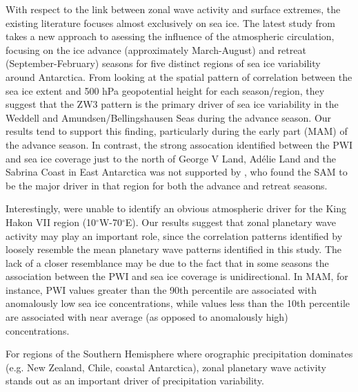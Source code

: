 With respect to the link between zonal wave activity and surface extremes, the existing literature focuses almost exclusively on sea ice. The latest study from \citet{Raphael2014} takes a new approach to asessing the influence of the atmospheric circulation, focusing on the ice advance (approximately March-August) and retreat (September-February) seasons for five distinct regions of sea ice variability around Antarctica. From looking at the spatial pattern of correlation between the sea ice extent and 500 hPa geopotential height for each season/region, they suggest that the ZW3 pattern is the primary driver of sea ice variability in the Weddell and Amundsen/Bellingshausen Seas during the advance season. Our results tend to support this finding, particularly during the early part (MAM) of the advance season. In contrast, the strong assocation identified between the PWI and sea ice coverage just to the north of George V Land, Ad{\'e}lie Land and the Sabrina Coast in East Antarctica was not supported by \citet{Raphael2014}, who found the SAM to be the major driver in that region for both the advance and retreat seasons. 

Interestingly, \citet{Raphael2014} were unable to identify an obvious atmospheric driver for the King Hakon VII region (10$^{\circ}$W-70$^{\circ}$E). Our results suggest that zonal planetary wave activity may play an important role, since the correlation patterns identified by \citet{Raphael2014} loosely resemble the mean planetary wave patterns identified in this study. The lack of a closer resemblance may be due to the fact that in some seasons the association between the PWI and sea ice coverage is unidirectional. In MAM, for instance, PWI values greater than the 90th percentile are associated with anomalously low sea ice concentrations, while values less than the 10th percentile are associated with near average (as opposed to anomalously high) concentrations.

For regions of the Southern Hemisphere where orographic precipitation dominates (e.g. New Zealand, Chile, coastal Antarctica), zonal planetary wave activity stands out as an important driver of precipitation variability.   










